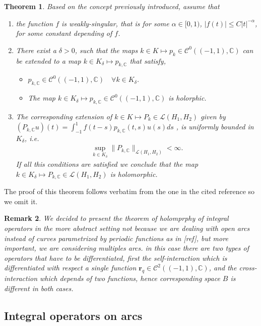 \documentclass{article}
\newtheorem{theorem}{Theorem}[section]
\newtheorem{remark}[theorem]{Remark}
\newcommand{\todo}[1]{{\color{red}[#1]}}
\newcommand{\IC}{{\mathbb C}}
\begin{document}
\begin{theorem}
\label{teo:hlm}
Based on the concept previously introduced, assume that 
\begin{enumerate}
\item 
the function $f$ is weakly-singular, that is for some $\alpha \in [0,1)$, $|f(t)| \leq C |t|^{-\alpha}$, for some constant depending of $f$.    
\item  
There exist a $\delta>0$, such that the maps $k  \in K \mapsto p_k \in \mathcal{C}^0((-1,1),\IC)$ can be extended to a map $k \in K_\delta \mapsto p_{k,\IC}$ that satisfy, 
\begin{itemize}
\item 
$p_{k,\IC} \in \mathcal{C}^0((-1,1),\IC) \quad \forall k \in K_\delta$. 
\item 
The map $k \in K_\delta \mapsto p_{k,\IC} \in \mathcal{C}^0((-1,1),\IC)$ is holorphic. 
\end{itemize}
\item 
The corresponding extension of $k \in K \mapsto P_k \in \mathcal{L}(H_1,H_2)$ given by $(P_{k,\IC}u)(t) = \int_{-1}^1f(t-s) p_{k,\IC}(t,s) u(s) ds$ , is uniformly bounded in $K_\delta$, i.e. 
\begin{align*}
\sup_{k \in K_\delta} \| P_{k,\IC}\|_{\mathcal{L}(H_1,H_2)} < \infty.
\end{align*}
If all this conditions are satisfied we conclude that the map $k \in K_\delta \mapsto P_{k,\IC} \in \mathcal{L}(H_1,H_2)$ is holomorphic. 
\end{enumerate}
\end{theorem}
The proof of this theorem follows verbatim from the one in the cited reference so we omit it.
\begin{remark}
We decided to present the theorem of holomprphy of integral operators in the more abstract setting not because we are dealing with open arcs instead of curves parametrized by periodic functions as in \todo{ref}, but more important, we are considering multiples arcs. in this case there are two types of operators that have to be differentiated, first the self-interaction which is differentiated with respect a single function $\mathbf{r}_q \in \mathcal{C}^2((-1,1),\IC)$, and the cross-interaction which depends of two functions, hence corresponding space $B$ is different in both cases. 
\end{remark}  

\subsection{Integral operators on arcs}
\end{document}
